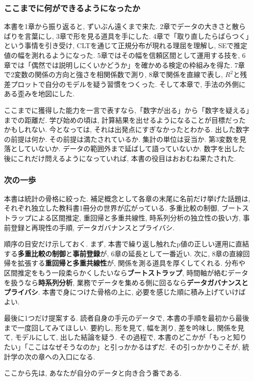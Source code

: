 \subsubsection*{ここまでに何ができるようになったか}

本書を1章から振り返ると, ずいぶん遠くまで来た.
2章でデータの大きさと散らばりを言葉にし, 3章で形を見る道具を手にした.
4章で「取り直したらばらつく」という事情を引き受け, CLTを通じて正規分布が現れる理屈を理解し, SEで推定値の幅を測れるようになった.
5章ではその幅を信頼区間として運用する技を, 6章では「偶然では説明しにくいかどうか」を確かめる検定の枠組みを得た.
7章で2変数の関係の方向と強さを相関係数で測り, 8章で関係を直線で表し, $R^2$と残差プロットで自分のモデルを疑う習慣をつくった.
そして本章で, 手法の外側にある歪みを地図にした.

ここまでに獲得した能力を一言で表すなら,「数字が出る」から「数字を疑える」までの距離だ.
学び始めの頃は, 計算結果を出せるようになることが目標だったかもしれない.
今となっては, それは出発点にすぎなかったとわかる.
出した数字の前提は何か. その前提は満たされているか. 集計の単位は妥当か. 第3変数を見落としていないか. データの範囲外まで延ばして語っていないか.
数字を出した後にこれだけ問えるようになっていれば, 本書の役目はおおむね果たされた.

\subsubsection*{次の一歩}

本書は統計の骨格に絞った. 補足概念として各章の末尾に名前だけ挙げた話題は, それぞれ独立した教科書1冊分の世界が広がっている.
多重比較の制御, ブートストラップによる区間推定, 重回帰と多重共線性, 時系列分析の独立性の扱い方, 事前登録と再現性の手順, データガバナンスとプライバシ.

順序の目安だけ示しておく.
まず, 本書で繰り返し触れたp値の正しい運用に直結する\textbf{多重比較の制御}と\textbf{事前登録}が, 6章の延長として一番近い.
次に, 8章の直線回帰を拡張する\textbf{重回帰と多重共線性}が, 関係を測る道具を厚くしてくれる.
分布や区間推定をもう一段柔らかくしたいなら\textbf{ブートストラップ}, 時間軸が絡むデータを扱うなら\textbf{時系列分析}, 業務でデータを集める側に回るなら\textbf{データガバナンスとプライバシ}.
本書で身につけた骨格の上に, 必要を感じた順に積み上げていけばよい.

最後に1つだけ提案する.
読者自身の手元のデータで, 本書の手順を最初から最後まで一度回してみてほしい.
要約し, 形を見て, 幅を測り, 差を吟味し, 関係を見て, モデルにして, 出した結論を疑う.
その過程で, 本書のどこかが「もっと知りたい」「ここはなぜそうなのか」と引っかかるはずだ.
その引っかかりこそが, 統計学の次の章への入口になる.

ここから先は, あなたが自分のデータと向き合う番である.
